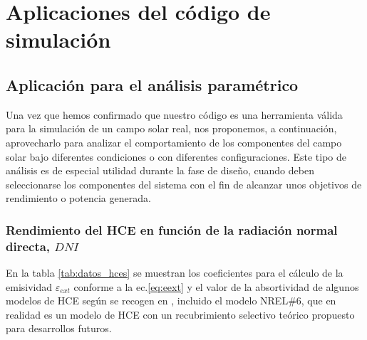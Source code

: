 \chapter{Aplicaciones del código de simulación}
\label{aplicaciones}

\section{Aplicación para el análisis paramétrico}
\label{analisis-parametrico}

Una vez que hemos confirmado que nuestro código es una herramienta válida para la simulación de un campo solar real, nos proponemos, a continuación, aprovecharlo para analizar el comportamiento de los componentes del campo solar bajo diferentes condiciones o con diferentes configuraciones. Este tipo de análisis es de especial utilidad durante la fase de diseño, cuando deben seleccionarse los componentes del sistema con el fin de alcanzar unos objetivos de rendimiento o potencia generada.

\subsection{Rendimiento del HCE en función de la radiación normal directa, $DNI$}

En la tabla \ref{tab:datos_hces} se muestran los coeficientes para el cálculo de la emisividad $\varepsilon_{ext}$ conforme a la ec.\eqref{eq:eext} y el valor de la absortividad de algunos modelos de HCE según se recogen en \cite{barberofresnoDesarrolloModeloTeorico2018}, incluido el modelo NREL\#6, que en realidad es un modelo de HCE con un recubrimiento selectivo teórico propuesto para desarrollos futuros.

\begin{table}[H]
\centering
\caption[Constantes del modelo de emisividad equivalente para cada uno de los receptores seleccionados]{Constantes del modelo de emisividad equivalente para cada uno de los receptores seleccionados. *Al no disponerse de este dato, se ha empleado este valor con el fin de poder incluir el modelo en el test. Fuente \cite{barberofresnoDesarrolloModeloTeorico2018}}
\label{tab:datos_hces}
\end{table}



